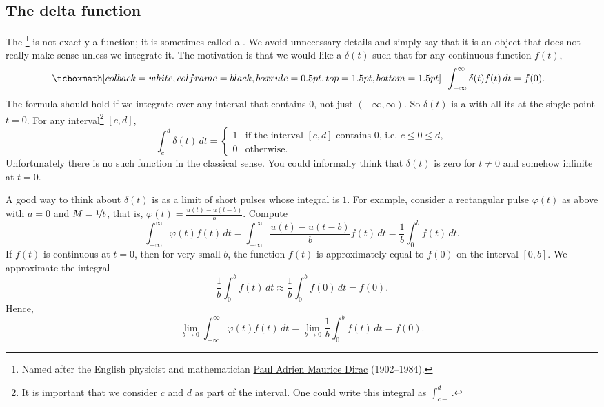 \subsection{The delta function}

The \emph{}%
\footnote{Named after the English physicist and mathematician
\href{https://en.wikipedia.org/wiki/Paul_Dirac}{Paul Adrien Maurice Dirac}
(1902--1984).}
is not exactly a function; it is sometimes called a
\emph{}.  We
avoid unnecessary details and simply say that it is an object
that does not really make sense unless we integrate it.  The motivation is
that we would like a  $\delta(t)$
such that 
for any continuous function $f(t)$,
\begin{equation*}
\mybxbg{~~
\int_{-\infty}^\infty \delta(t) f(t) \,dt = f(0) .
~~}
\end{equation*}
The formula should hold if we integrate over any interval that contains 0,
not just $(-\infty,\infty)$.
So $\delta(t)$ is a  
with all its  at the single point $t=0$.  For any
interval\footnote{%
It is important that we consider $c$ and $d$ as part of the
interval.  One could write this integral as $\int_{c-}^{d+}$.}
$[c,d]$,
\begin{equation*}
\int_c^d \delta(t) \,dt = 
\begin{cases}
1 & \text{if the interval $[c,d]$ contains 0, i.e.\ } c \leq 0 \leq d, \\
0 & \text{otherwise.}
\end{cases}
\end{equation*}
Unfortunately there is no such function in the classical sense.  You could
informally think that $\delta(t)$ is zero for $t\not=0$ and somehow
infinite at $t=0$.

A good way to think about $\delta(t)$ is as a limit of short pulses
whose integral is $1$.  For example, 
consider a rectangular pulse
$\varphi(t)$ as above with $a=0$ and
$M=\nicefrac{1}{b}$, that is, $\varphi(t) = \frac{u(t) - u(t-b)}{b}$.
Compute
\begin{equation*}
\int_{-\infty}^\infty \varphi(t) f(t) \,dt =
\int_{-\infty}^\infty \frac{u(t) - u(t-b)}{b} f(t) \,dt =
\frac{1}{b} \int_{0}^b f(t) \,dt .
\end{equation*}
If $f(t)$ is continuous at $t=0$, then
for very small $b$, the function $f(t)$ is approximately equal to $f(0)$ on
the interval $[0,b]$.  We approximate the integral
\begin{equation*}
\frac{1}{b} \int_{0}^b f(t) \,dt \approx
\frac{1}{b} \int_{0}^b f(0) \,dt = f(0) .
\end{equation*}
Hence,
\begin{equation*}
\lim_{b\to 0}
\int_{-\infty}^\infty \varphi(t) f(t) \,dt =
\lim_{b\to 0}
\frac{1}{b} \int_{0}^b f(t) \,dt  = f(0) .
\end{equation*}

